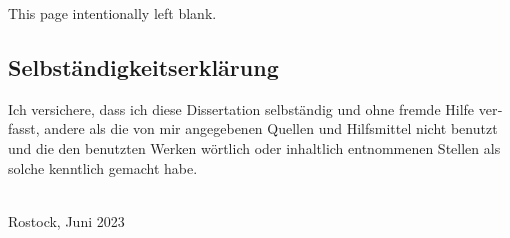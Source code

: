 \documentclass[
version=3.28,  %
a4paper,
11pt,
twoside,
openright,
cleardoublepage=empty,
BCOR=10mm,
DIV=12,
footinclude=false,
chapterprefix,
appendixprefix,
final,
]{scrbook}
\newcommand*{\mychapterformat}[1]{%
\hfill\chapappifchapterprefix{\ }\raisebox{-.4\baselineskip}[0pt][0pt]{%
\scalebox{4}{\rmfamily#1\thechapter\autodot}}%
\\[-.7\baselineskip]%
\textcolor{white}{\rule{\textwidth}{.5mm}}\\[-\baselineskip]%
\vspace{2mm}
\textcolor{white}{\rule{\textwidth}{.5mm}}\\[-\baselineskip]%
\vspace{2mm}
\textcolor{white}{\rule{\textwidth}{.5mm}}%
}
\renewcommand*{\chapterformat}{\mychapterformat{\itshape}}
\begin{document}








\begin{appendices}
\renewcommand{\thechapter}{%
\texorpdfstring{\textsc{\alph{chapter}}}{\Alph{chapter}}}
\renewcommand*{\chapterformat}{\mychapterformat{\mdseries}}


\setlength{\parindent}{0pt}
\setlength{\parskip}{.5\baselineskip plus .5\baselineskip}
\setlength{\parfillskip}{1em plus 1fil}

\cleardoubleoddpage
\thispagestyle{empty}
\mbox{}
\vfill
\markboth{}{}%
{\centering
 \normalfont
 \Huge \bfseries \sffamily \appendixpagename\par}%
\vfill

\clearpage
\thispagestyle{empty}
\mbox{}
\vfill
\centerline{\tiny This page intentionally left blank.}
\vfill
\vfill
\vfill
\clearpage





\end{appendices}

\backmatter

\printbibliography[title=References,heading=bibintoc]

\newpage

\begin{german}
\chapter*{Selbständigkeitserklärung}

Ich versichere, dass ich diese Dissertation
selbständig und ohne fremde Hilfe verfasst,
andere als die von mir angegebenen Quellen
und Hilfsmittel nicht benutzt und
die den benutzten Werken wörtlich oder inhaltlich entnommenen Stellen
als solche kenntlich gemacht habe.

\baselineskip

\noindent
\theauthor\\
Rostock, Juni 2023

\end{german}
\end{document}
